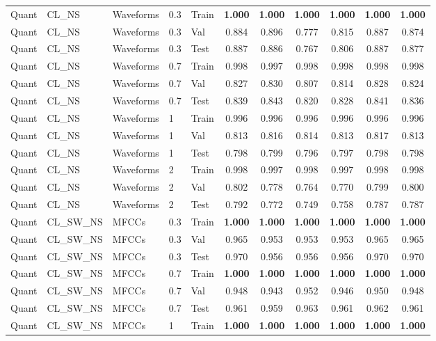 \begin{landscape}
\begin{longtable}{|l|l|l|l|l|c|c|c|c|c|c|}
Quant & CL\_NS & Waveforms & 0.3 & Train & \textbf{1.000} & \textbf{1.000} & \textbf{1.000} & \textbf{1.000} & \textbf{1.000} & \textbf{1.000} \\
Quant & CL\_NS & Waveforms & 0.3 & Val & 0.884 & 0.896 & 0.777 & 0.815 & 0.887 & 0.874 \\
Quant & CL\_NS & Waveforms & 0.3 & Test & 0.887 & 0.886 & 0.767 & 0.806 & 0.887 & 0.877 \\
Quant & CL\_NS & Waveforms & 0.7 & Train & 0.998 & 0.997 & 0.998 & 0.998 & 0.998 & 0.998 \\
Quant & CL\_NS & Waveforms & 0.7 & Val & 0.827 & 0.830 & 0.807 & 0.814 & 0.828 & 0.824 \\
Quant & CL\_NS & Waveforms & 0.7 & Test & 0.839 & 0.843 & 0.820 & 0.828 & 0.841 & 0.836 \\
Quant & CL\_NS & Waveforms & 1 & Train & 0.996 & 0.996 & 0.996 & 0.996 & 0.996 & 0.996 \\
Quant & CL\_NS & Waveforms & 1 & Val & 0.813 & 0.816 & 0.814 & 0.813 & 0.817 & 0.813 \\
Quant & CL\_NS & Waveforms & 1 & Test & 0.798 & 0.799 & 0.796 & 0.797 & 0.798 & 0.798 \\
Quant & CL\_NS & Waveforms & 2 & Train & 0.998 & 0.997 & 0.998 & 0.997 & 0.998 & 0.998 \\
Quant & CL\_NS & Waveforms & 2 & Val & 0.802 & 0.778 & 0.764 & 0.770 & 0.799 & 0.800 \\
Quant & CL\_NS & Waveforms & 2 & Test & 0.792 & 0.772 & 0.749 & 0.758 & 0.787 & 0.787 \\
Quant & CL\_SW\_NS & MFCCs & 0.3 & Train & \textbf{1.000} & \textbf{1.000} & \textbf{1.000} & \textbf{1.000} & \textbf{1.000} & \textbf{1.000} \\
Quant & CL\_SW\_NS & MFCCs & 0.3 & Val & 0.965 & 0.953 & 0.953 & 0.953 & 0.965 & 0.965 \\
Quant & CL\_SW\_NS & MFCCs & 0.3 & Test & 0.970 & 0.956 & 0.956 & 0.956 & 0.970 & 0.970 \\
Quant & CL\_SW\_NS & MFCCs & 0.7 & Train & \textbf{1.000} & \textbf{1.000} & \textbf{1.000} & \textbf{1.000} & \textbf{1.000} & \textbf{1.000} \\
Quant & CL\_SW\_NS & MFCCs & 0.7 & Val & 0.948 & 0.943 & 0.952 & 0.946 & 0.950 & 0.948 \\
Quant & CL\_SW\_NS & MFCCs & 0.7 & Test & 0.961 & 0.959 & 0.963 & 0.961 & 0.962 & 0.961 \\
Quant & CL\_SW\_NS & MFCCs & 1 & Train & \textbf{1.000} & \textbf{1.000} & \textbf{1.000} & \textbf{1.000} & \textbf{1.000} & \textbf{1.000} \\

\end{longtable}
\end{landscape}
